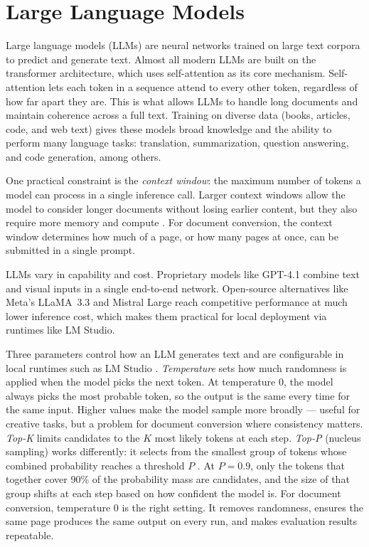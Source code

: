 \section{Large Language Models}
\label{sec:background:llms}

Large language models (LLMs) are neural networks trained on large text corpora
to predict and generate text. Almost all modern LLMs are built on the
transformer architecture, which uses self-attention as its core mechanism.
Self-attention lets each token in a sequence attend to every other token,
regardless of how far apart they are. This is what allows LLMs to handle long
documents and maintain coherence across a full text. Training on diverse data (books, articles, code, and web text) gives these
models broad knowledge
and the ability to perform many language tasks: translation, summarization,
question answering, and code generation, among others.

One practical constraint is the \textit{context window}: the maximum number of
tokens a model can process in a single inference call. Larger context windows
allow the model to consider longer documents without losing earlier content, but
they also require more memory and compute \autocite{ingemarsson2024}. For document
conversion, the context window determines how much of a page, or how many pages at once,
can be submitted in a single prompt.

LLMs vary in capability and cost. Proprietary models like GPT-4.1 combine text
and visual inputs in a single end-to-end network.
Open-source alternatives like Meta's LLaMA~3.3 and Mistral Large reach
competitive performance at much lower inference cost, which makes them
practical for local deployment via runtimes like LM Studio.

Three parameters control how an LLM generates text and are configurable in
local runtimes such as LM Studio \autocite{khan2024}. \textit{Temperature} sets
how much randomness is applied when the model picks the next token. At
temperature 0, the model always picks the most probable token, so the output
is the same every time for the same input. Higher values make the model sample
more broadly --- useful for creative tasks, but a problem for document
conversion where consistency matters. \textit{Top-K} limits candidates to the
$K$ most likely tokens at each step. \textit{Top-P} (nucleus sampling) works
differently: it selects from the smallest group of tokens whose combined
probability reaches a threshold $P$ \autocite{khan2024}. At $P = 0.9$, only the
tokens that together cover 90\% of the probability mass are candidates, and
the size of that group shifts at each step based on how confident the model
is. For document conversion, temperature 0 is the right setting. It removes
randomness, ensures the same page produces the same output on every run, and
makes evaluation results repeatable.

